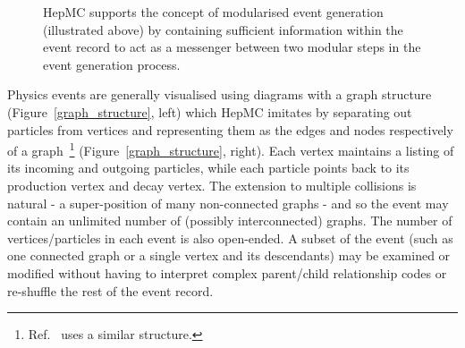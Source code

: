 \documentclass[11pt,letterpaper]{article}
\begin{document}
\begin{figure}[h]
  \begin{center}
    \end{center}
  \caption{\label{modularisation} 
    HepMC supports the concept of modularised event generation
    (illustrated above) by containing sufficient information within the
    event record to act as a messenger between two modular steps in
    the event generation process.  }
\end{figure}


Physics events are generally visualised using diagrams with a graph structure
(Figure~\ref{graph_structure}, left) which HepMC imitates by separating
out particles from vertices and representing them as the edges and
nodes respectively of a graph~\footnote{
  Ref.~\cite{mc++} uses a similar structure.} 
(Figure~\ref{graph_structure}, right). Each vertex maintains a listing of
its incoming and outgoing particles, while each particle points back
to its production vertex and decay vertex.
The extension to  multiple collisions is natural - a
super-position of many non-connected graphs - and so
the event may contain an unlimited number of (possibly interconnected)
graphs. The number of vertices/particles in each event is also open-ended.
A subset of the event (such as one connected graph or a single vertex
and its descendants) may be examined or modified without having to
interpret complex parent/child relationship codes or re-shuffle the rest 
of the event record.
\end{document}
